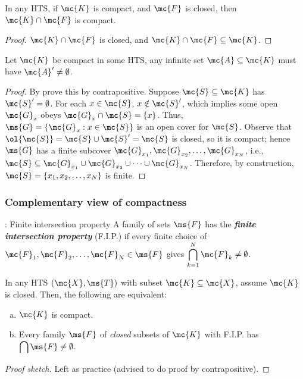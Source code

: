 \begin{corollary}
	In any HTS, if \(\mc{K}\) is compact, and \(\mc{F}\) is closed, then \(\mc{K}\cap\mc{F}\) is compact.
\end{corollary}
\begin{proof}
	\(\mc{K}\cap\mc{F}\) is closed, and \(\mc{K}\cap\mc{F}\subseteq\mc{K}\).
\end{proof}

\begin{corollary}
	Let \(\mc{K}\) be compact in some HTS, any infinite set \(\mc{A}\subseteq\mc{K}\) must have \(\mc{A}'\neq\emptyset\).
\end{corollary}
\begin{proof}
	By prove this by contrapositive. Suppose \(\mc{S}\subseteq\mc{K}\) has \(\mc{S}'=\emptyset\). For each \(x\in\mc{S}\), \(x\notin\mc{S}'\), which implies some open \(\mc{G}_x\) obeys \(\mc{G}_x\cap\mc{S}=\{x\}\). Thus, \(\ms{G}=\{\mc{G}_x:x\in\mc{S}\}\) is an open cover for \(\mc{S}\). Observe that \(\ol{\mc{S}}=\mc{S}\cup\mc{S}'=\mc{S}\) is closed, so it is compact; hence \(\ms{G}\) has a finite subcover \(\mc{G}_{x_1},\mc{G}_{x_2},\dots,\mc{G}_{x_N}\), i.e., \(\mc{S}\subseteq\mc{G}_{x_1}\cup\mc{G}_{x_2}\cup\dots\cup\mc{G}_{x_N}\). Therefore, by construction, \(\mc{S}=\{x_1,x_2,\dots,x_N\}\) is finite.
\end{proof}

\subsubsection{Complementary view of compactness}
\begin{ndef}{: Finite intersection property}
	A family of sets \(\ms{F}\) has the \emph{\textbf{finite intersection property}} (F.I.P.) if every finite choice of \(\mc{F}_1,\mc{F}_2,\dots,\mc{F}_N\in\ms{F}\) gives \(\displaystyle\bigcap_{k=1}^N \mc{F}_k\neq\emptyset\).
\end{ndef}

\begin{ntheorem}{}
	In any HTS \((\mc{X},\ms{T})\) with subset \(\mc{K}\subseteq\mc{X}\), assume \(\mc{K}\) is closed. Then, the following are equivalent:
	\begin{enumerate}[(a)]
		\item \(\mc{K}\) is compact.
		
		\item Every family \(\ms{F}\) of \emph{closed} subsets of \(\mc{K}\) with F.I.P. has \(\displaystyle\bigcap\ms{F}\neq\emptyset\).
	\end{enumerate}
\end{ntheorem}
\begin{proof}[Proof sketch]
	Left as practice (advised to do proof by contrapositive).
\end{proof}

